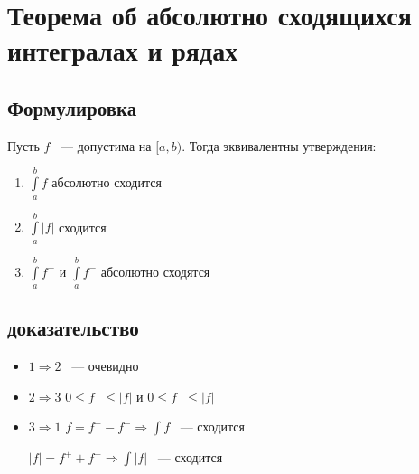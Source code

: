 \documentclass{article}
\begin{document}
    \newpage
    
    \section{Теорема об абсолютно сходящихся интегралах и рядах}
    
        \subsection{Формулировка}
        
            Пусть $f$ ~--- допустима на $[a, b)$. Тогда эквивалентны утверждения:
            
            \begin{enumerate}
            
                \item $\int\limits^b_a f$ абсолютно сходится
                
                \item $\int\limits^b_a |f|$ сходится
                
                \item $\int\limits^b_a f^+$ и $\int\limits^b_a f^-$ абсолютно сходятся
                
            \end{enumerate}
            
        \subsection{доказательство}
        
            \begin{itemize}
            
                \item $1 \Rightarrow 2$ ~--- очевидно
                
                \item $2 \Rightarrow 3$ $0 \leq f^+ \leq |f|$ и $0 \leq f^- \leq |f|$
                
                \item 
                
                    $3 \Rightarrow 1$ $f = f^+ - f^- \Rightarrow \int f$ ~--- сходится
                
                    $|f| = f^+ + f^- \Rightarrow \int |f|$ ~--- сходится
                    
            \end{itemize}
            
\end{document}
